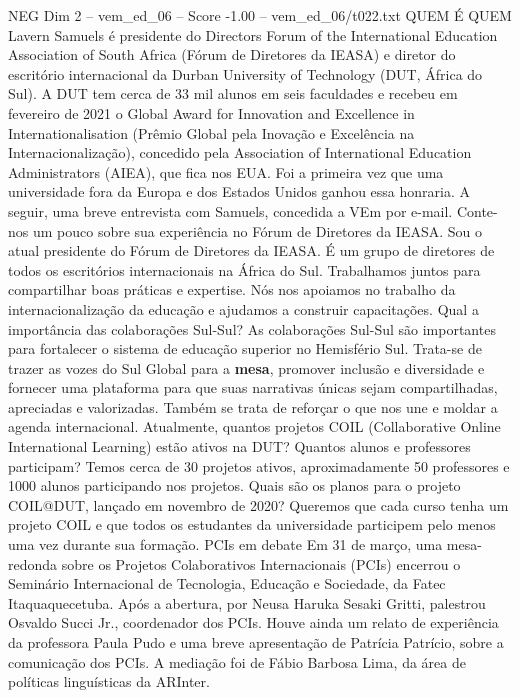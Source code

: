 \begin{textsample}{NEG Dim 2 – vem\_ed\_06 – Score -1.00 – vem\_ed\_06/t022.txt}  \label{ex:f2_neg_024}
QUEM É QUEM Lavern Samuels é presidente do Directors Forum of the International Education Association of South Africa (Fórum de Diretores da IEASA) e diretor do escritório internacional da Durban University of Technology (DUT, África do Sul).
A DUT tem cerca de 33 mil alunos em seis faculdades e recebeu em fevereiro de 2021 o Global Award for Innovation and Excellence in Internationalisation (Prêmio Global pela Inovação e Excelência na Internacionalização), concedido pela Association of International Education Administrators (AIEA), que fica nos EUA.
Foi a primeira vez que uma universidade fora da Europa e dos Estados Unidos ganhou essa honraria.
A seguir, uma breve entrevista com Samuels, concedida a VEm por e-mail.
Conte-nos um pouco sobre sua experiência no Fórum de Diretores da IEASA.
Sou o atual presidente do Fórum de Diretores da IEASA.
É um grupo de diretores de todos os escritórios internacionais na África do Sul.
Trabalhamos juntos para compartilhar boas práticas e expertise.
Nós nos apoiamos no trabalho da internacionalização da educação e ajudamos a construir capacitações.
Qual a importância das colaborações Sul-Sul?
As colaborações Sul-Sul são importantes para fortalecer o sistema de educação superior no Hemisfério Sul.
Trata-se de trazer as vozes do Sul Global para a \textbf{mesa}, promover inclusão e diversidade e fornecer uma plataforma para que suas narrativas únicas sejam compartilhadas, apreciadas e valorizadas.
Também se trata de reforçar o que nos une e moldar a agenda internacional.
Atualmente, quantos projetos COIL (Collaborative Online International Learning) estão ativos na DUT?
Quantos alunos e professores participam?
Temos cerca de 30 projetos ativos, aproximadamente 50 professores e 1000 alunos participando nos projetos.
Quais são os planos para o projeto COIL@DUT, lançado em novembro de 2020?
Queremos que cada curso tenha um projeto COIL e que todos os estudantes da universidade participem pelo menos uma vez durante sua formação.
PCIs em debate Em 31 de março, uma mesa-redonda sobre os Projetos Colaborativos Internacionais (PCIs) encerrou o Seminário Internacional de Tecnologia, Educação e Sociedade, da Fatec Itaquaquecetuba.
Após a abertura, por Neusa Haruka Sesaki Gritti, palestrou Osvaldo Succi Jr., coordenador dos PCIs.
Houve ainda um relato de experiência da professora Paula Pudo e uma breve apresentação de Patrícia Patrício, sobre a comunicação dos PCIs.
A mediação foi de Fábio Barbosa Lima, da área de políticas linguísticas da ARInter.

\end{textsample}
